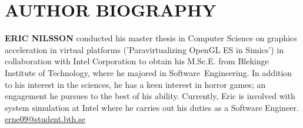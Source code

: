 
\section{AUTHOR BIOGRAPHY}
\label{sec:authorbiography}
\textbf{ERIC NILSSON} conducted his master thesis in Computer Science on graphics acceleration in virtual platforms ('Paravirtualizing OpenGL ES in Simics') in collaboration with Intel Corporation to obtain his M.Sc.E. from Blekinge Institute of Technology, where he majored in Software~Engineering.
In addition to his interest in the sciences, he has a keen interest in horror games; an engagement he pursues to the best of his ability.
Currently, Eric is involved with system simulation at Intel where he carries out his duties as a Software Engineer.\\

\href{mailto:erne09@student.bth.se}{erne09@student.bth.se}
